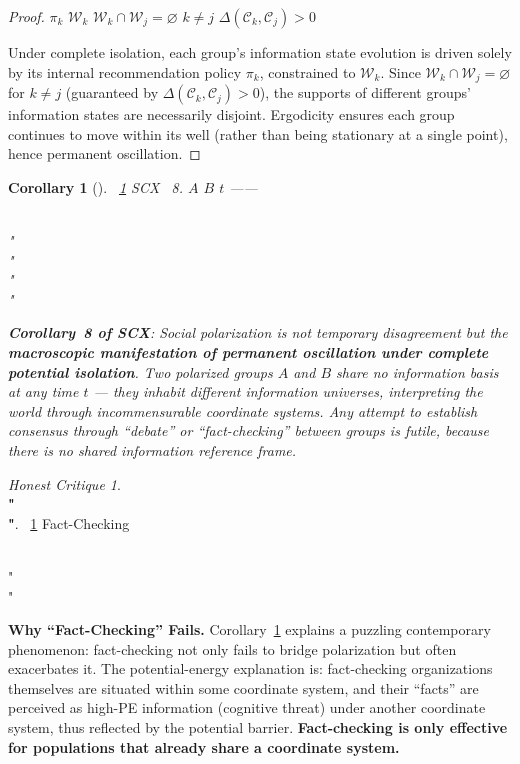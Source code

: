 \documentclass[11pt,a4paper]{article}
\newtheorem{corollary}[theorem]{Corollary}
\theoremstyle{remark}
\newtheorem{honestattack}{Honest Critique}
\newenvironment{attackbox}{%
  \begin{center}
  \color{red}
  \begin{minipage}{0.92\textwidth}
  \begin{honestattack}
}{%
  \end{honestattack}
  \end{minipage}
  \end{center}
}
\newcommand{\CoordSys}{\mathcal{C}}
\begin{document}
\begin{proof}
 $\pi_k$ 
 $\mathcal{W}_k$ 
 $\mathcal{W}_k \cap \mathcal{W}_j = \varnothing$  $k \neq j$
 $\Delta(\CoordSys_k, \CoordSys_j) > 0$ 



Under complete isolation, each group's information state evolution is driven solely by
its internal recommendation policy $\pi_k$, constrained to $\mathcal{W}_k$.
Since $\mathcal{W}_k \cap \mathcal{W}_j = \varnothing$ for $k \neq j$
(guaranteed by $\Delta(\CoordSys_k, \CoordSys_j) > 0$), the supports of different
groups' information states are necessarily disjoint. Ergodicity ensures each group
continues to move within its well (rather than being stationary at a single point),
hence permanent oscillation.
\end{proof}

\begin{corollary}[]
\label{cor:polarization}
~\ref{cor:polarization} SCX ~8.
\textbf{}
 $A$  $B$  $t$ ——

\\"\\"\\"\\"


\textbf{Corollary~8 of SCX}: Social polarization is not temporary disagreement but the
\textbf{macroscopic manifestation of permanent oscillation under complete potential isolation}.
Two polarized groups $A$ and $B$ share no information basis at any time $t$ ---
they inhabit different information universes, interpreting the world through
incommensurable coordinate systems. Any attempt to establish consensus through
``debate'' or ``fact-checking'' between groups is futile, because there is no
shared information reference frame.
\end{corollary}

\begin{attackbox}
  \textbf{\\"\\"}.
  ~\ref{cor:polarization} 
  Fact-Checking
  
  \\"\\"
  
  \textbf{}

  \textbf{Why ``Fact-Checking'' Fails.}
  Corollary~\ref{cor:polarization} explains a puzzling contemporary phenomenon:
  fact-checking not only fails to bridge polarization but often exacerbates it.
  The potential-energy explanation is: fact-checking organizations themselves are
  situated within some coordinate system, and their ``facts'' are perceived as
  high-PE information (cognitive threat) under another coordinate system, thus
  reflected by the potential barrier.
  \textbf{Fact-checking is only effective for populations that already share a
  coordinate system.}
\end{attackbox}
\end{document}
